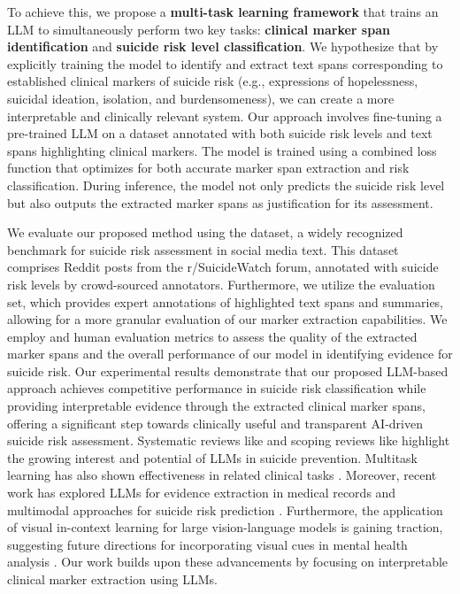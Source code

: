 To achieve this, we propose a \textbf{multi-task learning framework} that trains an LLM to simultaneously perform two key tasks: \textbf{clinical marker span identification} and \textbf{suicide risk level classification}. We hypothesize that by explicitly training the model to identify and extract text spans corresponding to established clinical markers of suicide risk (e.g., expressions of hopelessness, suicidal ideation, isolation, and burdensomeness), we can create a more interpretable and clinically relevant system. Our approach involves fine-tuning a pre-trained LLM on a dataset annotated with both suicide risk levels and text spans highlighting clinical markers. The model is trained using a combined loss function that optimizes for both accurate marker span extraction and risk classification. During inference, the model not only predicts the suicide risk level but also outputs the extracted marker spans as justification for its assessment.

We evaluate our proposed method using the \cite{CLPsych2019} dataset, a widely recognized benchmark for suicide risk assessment in social media text. This dataset comprises Reddit posts from the r/SuicideWatch forum, annotated with suicide risk levels by crowd-sourced annotators. Furthermore, we utilize the \cite{CLPsych2024} evaluation set, which provides expert annotations of highlighted text spans and summaries, allowing for a more granular evaluation of our marker extraction capabilities. We employ \cite{Zhang2019} and human evaluation metrics to assess the quality of the extracted marker spans and the overall performance of our model in identifying evidence for suicide risk. Our experimental results demonstrate that our proposed LLM-based approach achieves competitive performance in suicide risk classification while providing interpretable evidence through the extracted clinical marker spans, offering a significant step towards clinically useful and transparent AI-driven suicide risk assessment. Systematic reviews like \cite{systematicReviewLLM} and scoping reviews like \cite{scopingReviewLLM} highlight the growing interest and potential of LLMs in suicide prevention. Multitask learning has also shown effectiveness in related clinical tasks \cite{multitaskLearningEHR}. Moreover, recent work has explored LLMs for evidence extraction in medical records \cite{MedCheckLLM} and multimodal approaches for suicide risk prediction \cite{multimodalLLVM}.  Furthermore, the application of visual in-context learning for large vision-language models is gaining traction, suggesting future directions for incorporating visual cues in mental health analysis \cite{zhou2024visual}. Our work builds upon these advancements by focusing on interpretable clinical marker extraction using LLMs.

